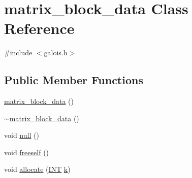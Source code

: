 \hypertarget{classmatrix__block__data}{}\section{matrix\+\_\+block\+\_\+data Class Reference}
\label{classmatrix__block__data}


{\ttfamily \#include $<$galois.\+h$>$}

\subsection*{Public Member Functions}
\begin{DoxyCompactItemize}
\item 
\mbox{\hyperlink{classmatrix__block__data_a2e14fed73e06c75aee44da5d40fe16cb}{matrix\+\_\+block\+\_\+data}} ()
\item 
\mbox{\hyperlink{classmatrix__block__data_a4ac2468bdb93625adfca81cac7e08620}{$\sim$matrix\+\_\+block\+\_\+data}} ()
\item 
void \mbox{\hyperlink{classmatrix__block__data_a97bb7f0f500960d73c595fd697f64fad}{null}} ()
\item 
void \mbox{\hyperlink{classmatrix__block__data_ae8df478b90bf9117a0edccdcb3c50c42}{freeself}} ()
\item 
void \mbox{\hyperlink{classmatrix__block__data_a88f74a8b5b682c2b3349df5ea3d9c0c9}{allocate}} (\mbox{\hyperlink{galois_8h_a09fddde158a3a20bd2dcadb609de11dc}{I\+NT}} \mbox{\hyperlink{simeon_8_c_a43fa990200c3ddd47c35f151bd4d66bf}{k}})
\end{DoxyCompactItemize}
